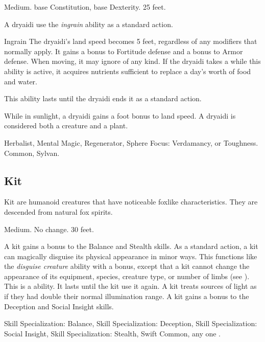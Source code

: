          Medium.
          base Constitution,  base Dexterity.
         25 feet.
        \begin{itemize}
             A dryaidi use the \textit{ingrain} ability as a standard action.
                \begin{freeability}{Ingrain}
                    The dryaidi's land speed becomes 5 feet, regardless of any modifiers that normally apply.
                    It gains a  bonus to Fortitude defense and a  bonus to Armor defense.
                    When moving, it may ignore  of any kind.
                    If the dryaidi takes a  while this ability is active, it acquires nutrients sufficient to replace a day's worth of food and water.

                    This ability lasts until the dryaidi ends it as a standard action.
                \end{freeability}
             While in sunlight, a dryaidi gains a  foot bonus to land speed.
             A dryaidi is considered both a creature and a plant.
        \end{itemize}
         Herbalist, Mental Magic, Regenerator, Sphere Focus: Verdamancy, or Toughness.
         Common, Sylvan.

    \subsection{Kit}

        Kit are humanoid creatures that have noticeable foxlike characteristics.
        They are descended from natural fox spirits.

         Medium.
         No change.
         30 feet.
        \begin{itemize}
             A kit gains a  bonus to the Balance and Stealth skills.
             As a standard action, a kit can magically disguise its physical appearance in minor ways.
                This functions like the \textit{disguise creature} ability with a  bonus, except that a kit cannot change the appearance of its equipment, species, creature type, or number of limbs (see ).
                This is a  ability.
                It lasts until the kit use it again.
             A kit treats sources of light as if they had double their normal illumination range.
             A kit gains a  bonus to the Deception and Social Insight skills.
        \end{itemize}
         Skill Specialization: Balance, Skill Specialization: Deception, Skill Specialization: Social Insight, Skill Specialization: Stealth, Swift
         Common, any one .

